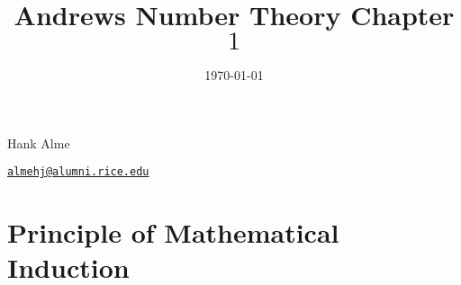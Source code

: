 \documentclass[12pt]{amsart}
\title{Andrews Number Theory Chapter $1$}
\date{\today}
\theoremstyle{definition}
\theoremstyle{remark}
\begin{document}
\maketitle

\vspace*{-0.25in}
\centerline{Hank Alme}
\centerline{\href{mailto:almehj@alumni.rice.edu}{{\tt almehj@alumni.rice.edu}}}
\vspace*{0.15in}

\section{Principle of Mathematical Induction}


\end{document}
